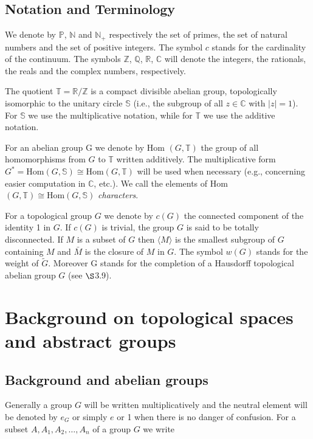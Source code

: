 \documentclass[12pt]{article}
\begin{document}
\tableofcontents


\subsection{Notation and Terminology}
        We denote by $\mathbb{P}$, $\mathbb{N}$ and $\mathbb{N}_+$ respectively the set of primes, the set of natural numbers and the set of positive
    integers. The symbol $c$ stands for the cardinality of the continuum. The symbols $\mathbb{Z}$, $\mathbb{Q}$, $\mathbb{R}$, $\mathbb{C}$ will denote the
    integers, the rationals, the reals and the complex numbers, respectively.
    

        The quotient $\mathbb{T} = \mathbb{R}/\mathbb{Z}$ is a compact divisible abelian group, topologically isomorphic to the unitary circle $\mathbb{S}$
    (i.e., the subgroup of all $z \in \mathbb{C}$ with $|z| = 1$). For $\mathbb{S}$ we use the multiplicative notation, while for $\mathbb{T}$ we use the
    additive notation.
    

        For an abelian group G we denote by Hom $(G,\mathbb{T})$ the group of all homomorphisms from $G$ to $\mathbb{T}$ written
    additively. The multiplicative form $G^* = \text{Hom} (G, \mathbb{S}) \cong \text{Hom} (G,\mathbb{T})$ will be used when necessary (e.g., concerning
    easier computation in $\mathbb{C}$, etc.). We call the elements of Hom $(G,\mathbb{T}) \cong \text{Hom} (G, \mathbb{S})$ \emph{characters}.
    

        For a topological group $G$ we denote by $c(G)$ the connected component of the identity 1 in $G$. If $c(G)$ is
    trivial, the group $G$ is said to be totally disconnected. If $M$ is a subset of $G$ then $\langle M \rangle$ is the smallest subgroup
    of $G$ containing $M$ and $\bar{M}$ is the closure of $M$ in $G$. The symbol $w(G)$ stands for the weight of $\tilde{G}$. Moreover G
    stands for the completion of a Hausdorff topological abelian group $G$ (see $\S$3.9).


\section{Background on topological spaces and abstract groups}


\subsection{Background and abelian groups}


Generally a group $G$ will be written multiplicatively and the neutral element will be denoted by $e_G$ or simply $e$
or 1 when there is no danger of confusion. For a subset $A, A_1, A_2, \dotsc , A_n$ of a group $G$ we write
\end{document}

